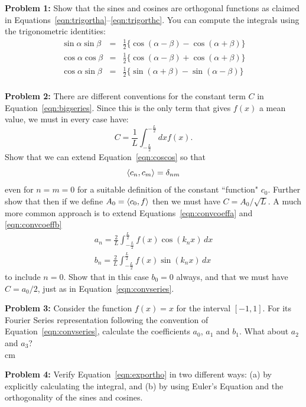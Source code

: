 \documentclass[12pt]{article}
\begin{document}
\noindent
{\bf Problem 1:} Show that the sines and cosines are orthogonal functions as claimed in Equations~\ref{eqn:trigortha}--\ref{eqn:trigorthc}.  You can compute the integrals using the trigonometric identities:
\begin{eqnarray*}
\sin \alpha \sin \beta &=& \frac{1}{2} \{\cos(\alpha - \beta) - \cos(\alpha + \beta)\}\\
\cos \alpha \cos \beta &=& \frac{1}{2} \{\cos(\alpha - \beta) + \cos(\alpha + \beta)\}\\
\cos \alpha \sin \beta &=& \frac{1}{2} \{\sin(\alpha + \beta) - \sin(\alpha - \beta)\}\\
\end{eqnarray*}
\vskip 0.5cm

\noindent
{\bf Problem 2:} There are different conventions for the constant term $C$ in Equation~\ref{eqn:bigseries}.
Since this is the only term that gives $f(x)$ a mean value, we must in every case have:
\begin{displaymath}
C = \frac{1}{L} \int_{-\frac{L}{2}}^{-\frac{L}{2}}  dx f(x).
\end{displaymath}
Show that we can extend Equation~\ref{eqn:coscos} so that
\begin{displaymath}
\braket{c_n,c_m} = \delta_{n m}
\end{displaymath}
even for $n=m=0$ for a suitable definition of the constant ``function" $c_0$.  Further show that then if we define $A_0 = \braket{c_0, f}$ then we must have $C = A_0/\sqrt{L}$.   A much more common approach is to extend Equations~\ref{eqn:convcoeffa} and \ref{eqn:convcoeffb} 
\begin{eqnarray*}
a_n  = \frac{2}{L} \int_{-\frac{L}{2}}^{\frac{L}{2}} 
f(x) \cos( k_n x) \, dx  \\
b_n  = \frac{2}{L} \int_{-\frac{L}{2}}^{\frac{L}{2}} 
f(x) \sin( k_n x) \, dx 
\end{eqnarray*}
to include $n=0$.  Show that in this case $b_0 = 0$ always, and that we must have $C = a_0/2$, just as in Equation~\ref{eqn:convseries}. \\
\vskip 0.5cm

\noindent
{\bf Problem 3:}  Consider the function $f(x) = x$ for the interval $[-1,1]$.  For its
Fourier Series representation following the convention of Equation~\ref{eqn:convseries}, calculate the coefficients $a_0$, $a_1$ and $b_1$.  What about $a_2$ and $a_3$? \\
 cm

\noindent
{\bf Problem 4:} Verify Equation~\ref{eqn:exportho} in two different ways: (a) by explicitly calculating the integral, and (b) by using Euler's Equation and the orthogonality of the sines and cosines.\\
\vskip 0.5cm
\end{document}
